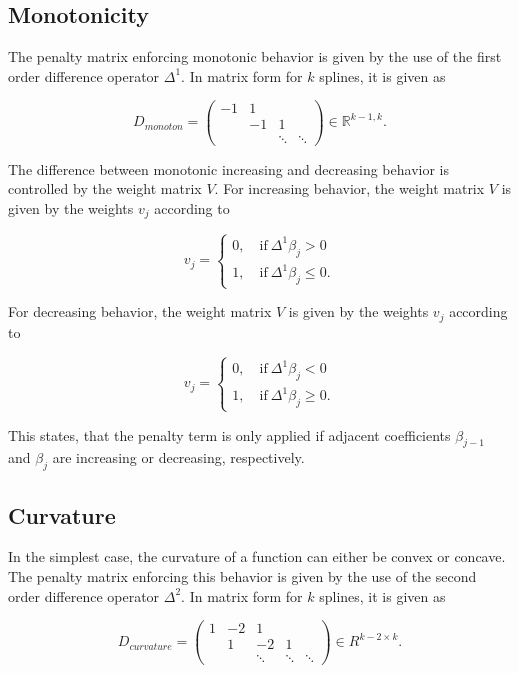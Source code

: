 \documentclass[10pt,a4paper]{article}
\begin{document}
	
	\subsection{Monotonicity}
	
	The penalty matrix enforcing monotonic behavior is given by the use of the first order difference operator $\Delta^1$. In matrix form for $k$ splines, it is given as
	
	$$D_{monoton} = \begin{pmatrix} -1 & 1  \\ & -1 & 1 \\ & & \ddots & \ddots  \end{pmatrix} \in \mathbb{R}^{k-1, k}.$$
	
	The difference between monotonic increasing and decreasing behavior is controlled by the weight matrix $V$. For increasing behavior, the weight matrix $V$ is given by the weights $v_j$ according to
	
	$$v_j = \begin{cases} 0, \quad \text{if} \ \Delta^1\beta_j > 0 \\ 
	1, \quad \text{if} \ \Delta^1\beta_j \le 0.\end{cases}$$
	
	For decreasing behavior, the weight matrix $V$ is given by the weights $v_j$ according to
	
	$$v_j = \begin{cases} 0, \quad \text{if} \ \Delta^1\beta_j < 0 \\ 
	1, \quad \text{if} \ \Delta^1\beta_j \ge 0.\end{cases}$$
	
	This states, that the penalty term is only applied if adjacent coefficients $\beta_{j-1}$ and $\beta_j$ are increasing or decreasing, respectively. 
	
	\subsection{Curvature}
	
	In the simplest case, the curvature of a function can either be convex or concave. The penalty matrix  enforcing this behavior is given by the use of the second order difference operator $\Delta^2$. In matrix form for $k$ splines, it is given as
	
	$$D_{curvature} = \begin{pmatrix} 1 & -2 & 1 \\ & 1 &-2 &1 \\ & & \ddots & \ddots & \ddots  \end{pmatrix} \in R^{k-2 \times k}.$$
	
\end{document}
